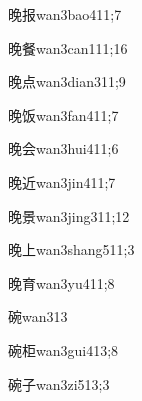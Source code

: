 \begin{verbete}{晚报}{wan3bao4}{11;7}
\end{verbete}

\begin{verbete}{晚餐}{wan3can1}{11;16}
\end{verbete}

\begin{verbete}{晚点}{wan3dian3}{11;9}
\end{verbete}

\begin{verbete}{晚饭}{wan3fan4}{11;7}
\end{verbete}

\begin{verbete}{晚会}{wan3hui4}{11;6}
\end{verbete}

\begin{verbete}{晚近}{wan3jin4}{11;7}
\end{verbete}

\begin{verbete}{晚景}{wan3jing3}{11;12}
\end{verbete}

\begin{verbete}{晚上}{wan3shang5}{11;3}
\end{verbete}

\begin{verbete}{晚育}{wan3yu4}{11;8}
\end{verbete}

\begin{verbete}{碗}{wan3}{13}
\end{verbete}

\begin{verbete}{碗柜}{wan3gui4}{13;8}
\end{verbete}

\begin{verbete}{碗子}{wan3zi5}{13;3}
\end{verbete}

